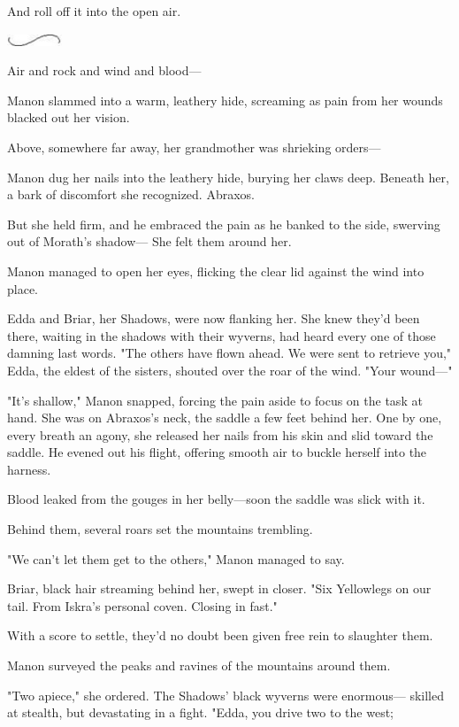 And roll off it into the open air.

\includegraphics[width=0.65in,height=0.13in]{images/seperator}

Air and rock and wind and blood---

Manon slammed into a warm, leathery hide, screaming as pain from her wounds blacked out her vision.

Above, somewhere far away, her grandmother was shrieking orders---

Manon dug her nails into the leathery hide, burying her claws deep. Beneath her, a bark of discomfort she recognized. Abraxos.

But she held firm, and he embraced the pain as he banked to the side, swerving out of Morath's shadow--- She felt them around her.

Manon managed to open her eyes, flicking the clear lid against the wind into place.

Edda and Briar, her Shadows, were now flanking her. She knew they'd been there, waiting in the shadows with their wyverns, had heard every one of those damning last words. "The others have flown ahead. We were sent to retrieve you," Edda, the eldest of the sisters, shouted over the roar of the wind. "Your wound---"

"It's shallow," Manon snapped, forcing the pain aside to focus on the task at hand. She was on Abraxos's neck, the saddle a few feet behind her. One by one, every breath an agony, she released her nails from his skin and slid toward the saddle. He evened out his flight, offering smooth air to buckle herself into the harness.

Blood leaked from the gouges in her belly---soon the saddle was slick with it.

Behind them, several roars set the mountains trembling.

"We can't let them get to the others," Manon managed to say.

Briar, black hair streaming behind her, swept in closer. "Six Yellowlegs on our tail. From Iskra's personal coven. Closing in fast."

With a score to settle, they'd no doubt been given free rein to slaughter them.

Manon surveyed the peaks and ravines of the mountains around them.

"Two apiece," she ordered. The Shadows' black wyverns were enormous--- skilled at stealth, but devastating in a fight. "Edda, you drive two to the west;

